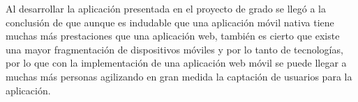 %
Al desarrollar la aplicación presentada en el proyecto de grado se llegó a la conclusión de que aunque es indudable que una aplicación móvil nativa tiene muchas más prestaciones que una aplicación web, también es cierto que existe una mayor fragmentación de dispositivos móviles y  por lo tanto de tecnologías, por lo que con la implementación de una aplicación web móvil se puede llegar a muchas más personas agilizando en gran medida la captación de usuarios para la aplicación.
%
%
%
%

